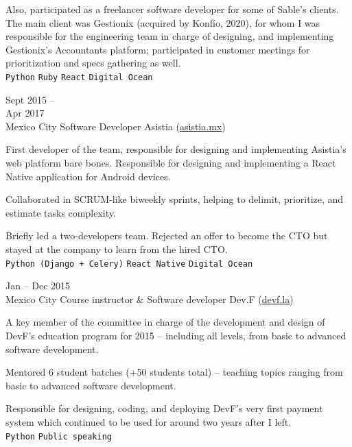\documentclass[9pt]{developercv} %
\begin{document}
\begin{entrylist}
{            Also, participated as a freelancer software developer for some of Sable's clients. The main client was Gestionix (acquired by Konfío, 2020), for whom I was responsible for the engineering team in charge of designing, and implementing Gestionix's Accountants platform; participated in customer meetings for prioritization and specs gathering as well.\\
            \texttt{Python}
            \slashsep\texttt{Ruby}
            \slashsep\texttt{React}
            \slashsep\texttt{Digital Ocean}
        }

    \entry
        {
            Sept 2015 --\\Apr 2017
            \\\footnotesize{Mexico City}
        }
        {Software Developer}
        {Asistia ({\href{https://www.linkedin.com/company/asistia/}{\underline{asistia.mx}}})}
        {
            First developer of the team, responsible for designing and implementing Asistia's web platform bare bones. Responsible for designing and implementing a React Native application for Android devices. 

            Collaborated in SCRUM-like biweekly sprints, helping to delimit, prioritize, and estimate tasks complexity.
            
            Briefly led a two-developers team. Rejected an offer to become the CTO but stayed at the company to learn from the hired CTO.\\
            \texttt{Python (Django + Celery)}
            \slashsep\texttt{React Native}
            \slashsep\texttt{Digital Ocean}}

    \entry
        {
            Jan -- Dec 2015
            \\\footnotesize{Mexico City}
        }
        {Course instructor \& Software developer}
        {Dev.F ({\href{https://devf.la/}{\underline{devf.la}}})}
        {
            A key member of the committee in charge of the development and design of DevF's education program for 2015 – including all levels, from basic to advanced software development. 

            Mentored 6 student batches (+50 students total) – teaching topics ranging from basic to advanced software development.
            
            Responsible for designing, coding, and deploying DevF's very first payment system which continued to be used for around two years after I left.\\
            \texttt{Python}
            \slashsep\texttt{Public speaking}
        }


\end{entrylist}
\end{document}
